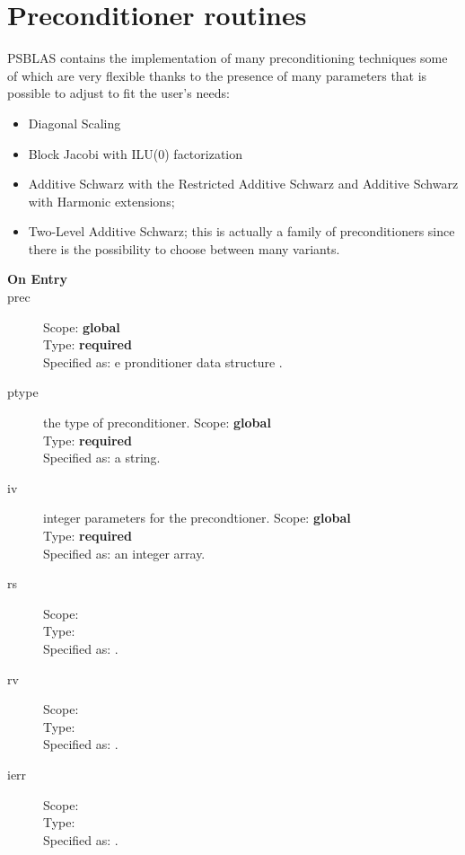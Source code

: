\section{Preconditioner routines}
\label{sec:precs}

\label{sec:psprecs}
PSBLAS contains the implementation of many preconditioning
techniques some of which are very flexible thanks to the presence of
many parameters that is possible to adjust to fit the user's needs:
\begin{itemize}
\item Diagonal Scaling
\item Block Jacobi with ILU(0) factorization
\item Additive Schwarz with the Restricted Additive Schwarz and
  Additive Schwarz with Harmonic extensions;
\item Two-Level Additive Schwarz; this is actually a family of
  preconditioners since there is the possibility to choose between
  many variants.
\end{itemize}





\begin{description}
\item[\bf On Entry]
\item[prec] 
Scope: {\bf global} \\
Type: {\bf required}\\
Specified as: e pronditioner data structure \precdata.
\item[ptype] the type of preconditioner. 
Scope: {\bf global} \\
Type: {\bf required}\\
Specified as: a string.
\item[iv] integer parameters for the precondtioner. 
Scope: {\bf global} \\
Type: {\bf required}\\
Specified as: an integer array.
\item[rs] 
Scope: {\bf } \\
Type: {\bf }\\
Specified as: .
\item[rv] 
Scope: {\bf } \\
Type: {\bf }\\
Specified as: .
\item[ierr] 
Scope: {\bf } \\
Type: {\bf }\\
Specified as: .
\end{description}




